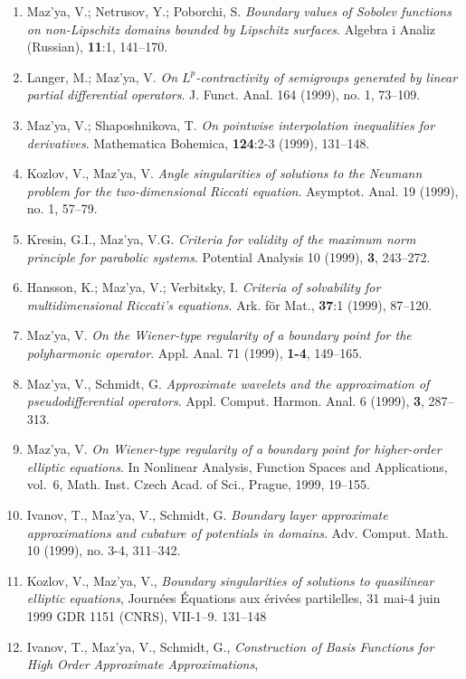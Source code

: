 \documentclass{article}
\begin{document}
\begin{enumerate}
{\bf 1999}
\item Maz'ya, V.; Netrusov, Y.; Poborchi, S. {\it Boundary values of
Sobolev functions on non-Lipschitz domains bounded by Lipschitz
surfaces}. Algebra i Analiz (Russian), {\bf 11}:1, 141--170.
\item Langer, M.; Maz'ya, V. {\it On $L^p$-contractivity of semigroups
generated by linear partial differential operators}.
J. Funct. Anal. 164 (1999), no. 1, 73--109.
\item Maz'ya, V.; Shaposhnikova, T. {\it On pointwise interpolation
inequalities for derivatives}. Mathematica Bohemica, \textbf{124}:2-3
(1999),
131--148.
\item Kozlov, V., Maz'ya, V. {\it Angle singularities of solutions to
the
Neumann problem for the two-dimensional Riccati
equation}. Asymptot. Anal. 19 (1999), no. 1, 57--79.
\item Kresin, G.I., Maz'ya, V.G. {\it Criteria for validity of the
maximum
norm principle for parabolic systems}. Potential
Analysis 10 (1999), {\bf 3}, 243--272.
\item Hansson, K.; Maz'ya, V.; Verbitsky, I. {\it Criteria of
solvability
for multidimensional Riccati's equations}. Ark. f\"or
Mat., {\bf 37}:1 (1999), 87--120.
\item Maz'ya, V. {\it On the Wiener-type regularity of a boundary
point for
the polyharmonic operator}. Appl. Anal. 71 (1999), {\bf 1-4},
149--165.
\item Maz'ya, V., Schmidt, G. {\it Approximate wavelets and the
approximation of pseudodifferential operators}. Appl.
Comput. Harmon. Anal. 6 (1999), {\bf 3}, 287--313.
\item Maz'ya, V. {\it On Wiener-type regularity of a boundary point
for
higher-order elliptic equations}. In Nonlinear Analysis, Function
Spaces and
Applications, vol.~6, Math. Inst. Czech Acad. of Sci., Prague, 1999,
19--155.
\item Ivanov, T., Maz'ya, V., Schmidt, G. {\it Boundary layer
approximate
approximations and cubature of potentials in domains}.
Adv. Comput. Math. 10 (1999), no. 3-4, 311--342.
\item Kozlov, V., Maz'ya, V., {\it Boundary singularities of solutions
     to quasilinear elliptic equations}, Journ\'ees \'Equations aux
\'eriv\'ees
     partilelles, 31 mai-4 juin 1999 GDR 1151 (CNRS), VII-1--9.
   131--148
\item Ivanov, T., Maz'ya, V., Schmidt, G.,
           {\it Construction of Basis Functions for High
            Order Approximate Approximations},

\end{enumerate}
\end{document}
